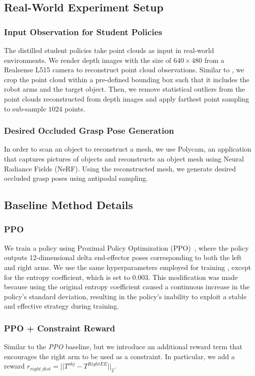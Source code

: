 \subsection{Real-World Experiment Setup}
\subsubsection{Input Observation for Student Policies}
The distilled student policies take point clouds as input in real-world environments.
We render depth images with the size of $640\times480$ from a Realsense L515 camera to reconstruct point cloud observations.
Similar to \cite{ze20243d}, we crop the point cloud within a pre-defined bounding box such that it includes the robot arms and the target object.
Then, we remove statistical outliers from the point clouds reconstructed from depth images and apply farthest point sampling to sub-sample $1024$ points.

\subsubsection{Desired Occluded Grasp Pose Generation}
In order to scan an object to reconstruct a mesh, we use Polycam, an application that captures pictures of objects and reconstructs an object mesh using Neural Radiance Fields (NeRF).
Using the reconstructed mesh, we generate desired occluded grasp poses using antipodal sampling.


\subsection{Baseline Method Details}

\subsubsection{PPO}
We train a policy using Proximal Policy Optimization (PPO)~\cite{schulman2017proximal}, where the policy outputs 12-dimensional delta end-effector poses corresponding to both the left and right arms. 
We use the same hyperparameters employed for training \ourmethod, except for the entropy coefficient, which is set to $0.003$. 
This modification was made because using the original entropy coefficient caused a continuous increase in the policy's standard deviation, resulting in the policy's inability to exploit a stable and effective strategy during training.


\subsubsection{PPO + Constraint Reward}
Similar to the \emph{PPO} baseline, but we introduce an additional reward term that encourages the right arm to be used as a constraint.
In particular, we add a reward $r_{right\_dist}=||T^{obj} - T^{RightEE}||_{2}$.

